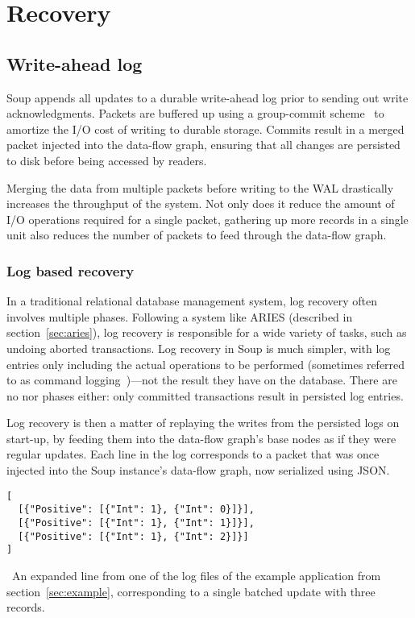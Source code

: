 \chapter{Recovery}\label{chap:recovery}

\section{Write-ahead log}

Soup appends all updates to a durable write-ahead log prior to sending out write
acknowledgments. Packets are buffered up using a group-commit
scheme~\cite{main-memory} to amortize the I/O cost of writing to durable
storage. Commits result in a merged packet injected into the data-flow graph,
ensuring that all changes are persisted to disk before being accessed by
readers.

Merging the data from multiple packets before writing to the WAL drastically
increases the throughput of the system. Not only does it reduce the amount of
I/O operations required for a single packet, gathering up more records in a
single unit also reduces the number of packets to feed through the data-flow graph.


\subsection{Log based recovery}

In a traditional relational database management system, log recovery often
involves multiple phases. Following a system like ARIES (described in
section~\ref{sec:aries}), log recovery is responsible for a wide variety of
tasks, such as undoing aborted transactions. Log recovery in Soup is much
simpler, with log entries only including the actual operations to be performed
(sometimes referred to as command logging~\cite{voltdb-recovery})---not the
result they have on the database. There are no  nor 
phases either: only committed transactions result in persisted log entries.

Log recovery is then a matter of replaying the writes from the persisted logs on
start-up, by feeding them into the data-flow graph's base nodes as if they were
regular updates. Each line in the log corresponds to a packet that was once
injected into the Soup instance's data-flow graph, now serialized using JSON.\@

\begin{listing}[H]
  \begin{verbatim}
[
  [{"Positive": [{"Int": 1}, {"Int": 0}]}],
  [{"Positive": [{"Int": 1}, {"Int": 1}]}],
  [{"Positive": [{"Int": 1}, {"Int": 2}]}]
]
  \end{verbatim}
  \caption{\
    An expanded line from one of the log files of the example application from
    section~\ref{sec:example}, corresponding to a single batched update with
    three records.
  }\label{lst:log-entry}
\end{listing}

